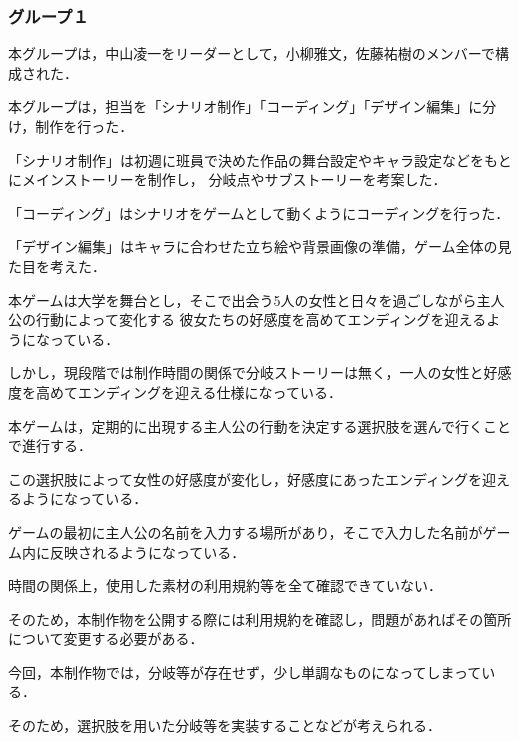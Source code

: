 \subsubsection{グループ１}
    
    本グループは，中山凌一をリーダーとして，小柳雅文，佐藤祐樹のメンバーで構成された．


    本グループは，担当を「シナリオ制作」「コーディング」「デザイン編集」に分け，制作を行った．

    「シナリオ制作」は初週に班員で決めた作品の舞台設定やキャラ設定などをもとにメインストーリーを制作し，
    分岐点やサブストーリーを考案した．

    「コーディング」はシナリオをゲームとして動くようにコーディングを行った．

    「デザイン編集」はキャラに合わせた立ち絵や背景画像の準備，ゲーム全体の見た目を考えた．

    \newpage


    本ゲームは大学を舞台とし，そこで出会う5人の女性と日々を過ごしながら主人公の行動によって変化する
    彼女たちの好感度を高めてエンディングを迎えるようになっている．

    しかし，現段階では制作時間の関係で分岐ストーリーは無く，一人の女性と好感度を高めてエンディングを迎える仕様になっている．
    
    本ゲームは，定期的に出現する主人公の行動を決定する選択肢を選んで行くことで進行する．

    この選択肢によって女性の好感度が変化し，好感度にあったエンディングを迎えるようになっている．


    ゲームの最初に主人公の名前を入力する場所があり，そこで入力した名前がゲーム内に反映されるようになっている．


    時間の関係上，使用した素材の利用規約等を全て確認できていない．

    そのため，本制作物を公開する際には利用規約を確認し，問題があればその箇所について変更する必要がある．


    今回，本制作物では，分岐等が存在せず，少し単調なものになってしまっている．

    そのため，選択肢を用いた分岐等を実装することなどが考えられる．
